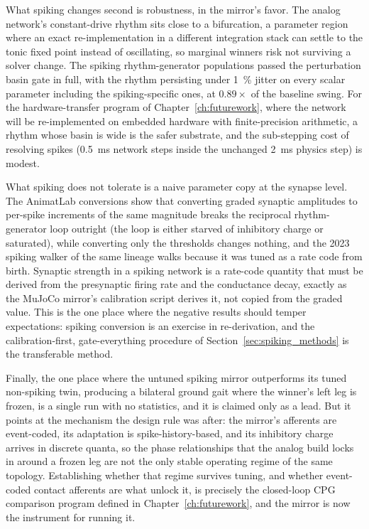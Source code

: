 What spiking changes second is robustness, in the mirror's favor. The analog network's constant-drive rhythm sits close to a bifurcation, a parameter region where an exact re-implementation in a different integration stack can settle to the tonic fixed point instead of oscillating, so marginal winners risk not surviving a solver change. The spiking rhythm-generator populations passed the perturbation basin gate in full, with the rhythm persisting under \qty{1}{\percent} jitter on every scalar parameter including the spiking-specific ones, at $0.89\times$ of the baseline swing. For the hardware-transfer program of Chapter~\ref{ch:futurework}, where the network will be re-implemented on embedded hardware with finite-precision arithmetic, a rhythm whose basin is wide is the safer substrate, and the sub-stepping cost of resolving spikes (\qty{0.5}{\milli\second} network steps inside the unchanged \qty{2}{\milli\second} physics step) is modest.

What spiking does not tolerate is a naive parameter copy at the synapse level. The AnimatLab conversions show that converting graded synaptic amplitudes to per-spike increments of the same magnitude breaks the reciprocal rhythm-generator loop outright (the loop is either starved of inhibitory charge or saturated), while converting only the thresholds changes nothing, and the 2023 spiking walker of the same lineage walks because it was tuned as a rate code from birth. Synaptic strength in a spiking network is a rate-code quantity that must be derived from the presynaptic firing rate and the conductance decay, exactly as the MuJoCo mirror's calibration script derives it, not copied from the graded value. This is the one place where the negative results should temper expectations: spiking conversion is an exercise in re-derivation, and the calibration-first, gate-everything procedure of Section~\ref{sec:spiking_methods} is the transferable method.

Finally, the one place where the untuned spiking mirror outperforms its tuned non-spiking twin, producing a bilateral ground gait where the winner's left leg is frozen, is a single run with no statistics, and it is claimed only as a lead. But it points at the mechanism the design rule was after: the mirror's afferents are event-coded, its adaptation is spike-history-based, and its inhibitory charge arrives in discrete quanta, so the phase relationships that the analog build locks in around a frozen leg are not the only stable operating regime of the same topology. Establishing whether that regime survives tuning, and whether event-coded contact afferents are what unlock it, is precisely the closed-loop CPG comparison program defined in Chapter~\ref{ch:futurework}, and the mirror is now the instrument for running it.

